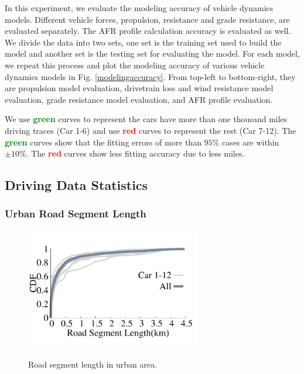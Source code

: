 In this experiment, we evaluate the modeling accuracy of vehicle dynamics models. 
Different vehicle forces, propulsion, resistance and grade resistance, are
evaluated separately. 
The AFR profile calculation accuracy is evaluated as well. 
We divide the data into two sets, one set is the training set 
used to build the model and another set is the testing set
for evaluating the model. 
For each model, we repeat this process and plot the 
modeling accuracy of various vehicle dynamics models in Fig. \ref{modelingaccuracy}. 
From top-left to bottom-right, they are propulsion model evaluation, 
drivetrain loss and wind resistance model evaluation, 
grade resistance model evaluation, 
and AFR profile evaluation. 


We use \textcolor{green}{\textbf{green}} curves to represent the cars have more than one thousand miles
driving traces (Car 1-6) and use \textcolor{red}{\textbf{red}} curves to represent the rest (Car 7-12). 
The \textcolor{green}{\textbf{green}} curves show that the fitting errors of 
more than $95\%$ cases are within $\pm10\%$. 
The \textcolor{red}{\textbf{red}} curves show less fitting accuracy 
due to less miles. 




\subsection{Driving Data Statistics}

\subsubsection{Urban Road Segment Length}

\begin{figure}[!htbp]
\begin{center}
\vspace{-0.3cm}
\includegraphics[width=3.0in,angle=0]{Figs/EcoDrive/evaluation/urban_road_segment.pdf}
\vspace{-0.0cm}
\caption{Road segment length in urban area.}
\vspace{-0.8cm}
\label{urbanroad}
\end{center}
\end{figure}

